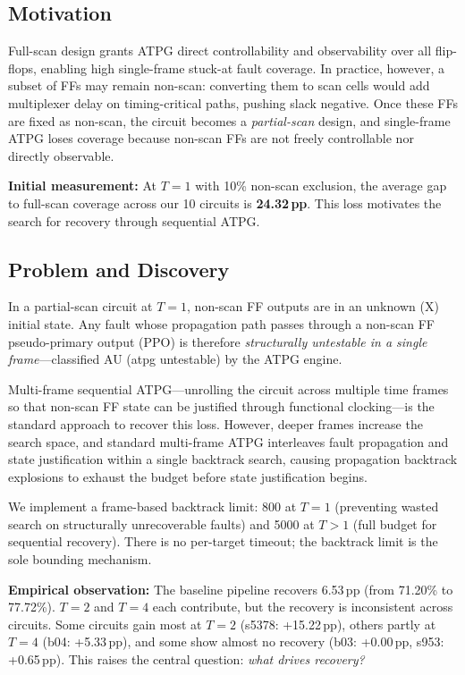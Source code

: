 \documentclass[conference]{IEEEtran}
\begin{document}
\subsection{Motivation}
Full-scan design grants ATPG direct controllability and observability over all
flip-flops, enabling high single-frame stuck-at fault coverage. In practice,
however, a subset of FFs may remain non-scan: converting them to scan cells
would add multiplexer delay on timing-critical paths, pushing slack negative.
Once these FFs are fixed as non-scan, the circuit becomes a \emph{partial-scan}
design, and single-frame ATPG loses coverage because non-scan FFs are not
freely controllable nor directly observable.

\textbf{Initial measurement:} At $T{=}1$ with 10\% non-scan exclusion, the
average gap to full-scan coverage across our 10 circuits is \textbf{24.32\,pp}.
This loss motivates the search for recovery through sequential ATPG.

\subsection{Problem and Discovery}
In a partial-scan circuit at $T{=}1$, non-scan FF outputs are in an unknown (X)
initial state. Any fault whose propagation path passes through a non-scan FF
pseudo-primary output (PPO) is therefore \emph{structurally untestable in a
single frame}---classified AU (atpg untestable) by the ATPG engine.

Multi-frame sequential ATPG---unrolling the circuit across multiple time frames
so that non-scan FF state can be justified through functional clocking---is the
standard approach to recover this loss. However, deeper frames increase the
search space, and standard multi-frame ATPG interleaves fault propagation and
state justification within a single backtrack search, causing propagation
backtrack explosions to exhaust the budget before state justification begins.

We implement a frame-based backtrack limit: 800 at $T{=}1$ (preventing
wasted search on structurally unrecoverable faults) and 5000
at $T{>}1$ (full budget for sequential recovery). There is no per-target
timeout; the backtrack limit is the sole bounding mechanism.

\textbf{Empirical observation:} The baseline pipeline recovers 6.53\,pp (from
71.20\% to 77.72\%). $T{=}2$ and $T{=}4$ each contribute, but the recovery is
inconsistent across circuits. Some circuits gain most at $T{=}2$ (s5378:
+15.22\,pp), others partly at $T{=}4$ (b04: +5.33\,pp), and some show almost no
recovery (b03: +0.00\,pp, s953: +0.65\,pp). This raises the central question:
\emph{what drives recovery?}
\end{document}
